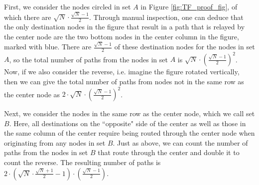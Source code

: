 First, we consider the nodes circled in set $A$ in Figure \ref{fig:TF_proof_fig}, of which there are $\sqrt{N} \cdot \frac{\sqrt{N}-1}{2}$.  Through manual inspection, one can deduce that the only destination nodes in the figure that result in a path that is relayed by the center node are the two bottom nodes in the center column in the figure, marked with blue.  
There are $\frac{\sqrt{N}-1}{2}$ of these destination nodes for the nodes in set $A$, so the total number of paths from the nodes in set $A$ is $\sqrt{N} \cdot (\frac{\sqrt{N}-1}{2})^2$.  Now, if we also consider the reverse, i.e. imagine the figure rotated vertically, then we can give the total number of paths from nodes not in the same row as the center node as $2 \cdot \sqrt{N} \cdot (\frac{\sqrt{N}-1}{2})^2$.

Next, we consider the nodes in the same row as the center node, which we call set $B$.  
Here, all destinations on the ``opposite" side of the center as well as those in the same column of the center require being routed through the center node when originating from any nodes in set $B$.  Just as above, we can count the number of paths from the nodes in set $B$ that route through the center and double it to count the reverse.  The resulting number of paths is $2 \cdot (\sqrt{N} \cdot \frac{\sqrt{N}+1}{2}-1) \cdot (\frac{\sqrt{N}-1}{2})$.
%

